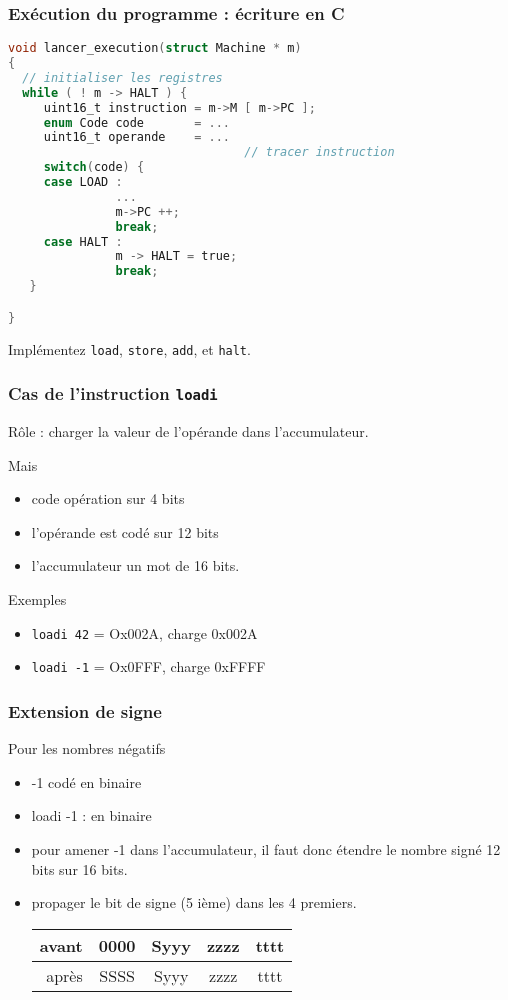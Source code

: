 \documentclass[]{beamer}
\begin{document}
\begin{frame}[containsverbatim]
  \frametitle{Exécution du programme : écriture en C}
\footnotesize
\begin{lstlisting}[frame=single, language=C]
void lancer_execution(struct Machine * m) 
{
  // initialiser les registres
  while ( ! m -> HALT ) { 
     uint16_t instruction = m->M [ m->PC ];
     enum Code code       = ... 
     uint16_t operande    = ...
                                 // tracer instruction
     switch(code) {
     case LOAD :
               ...
               m->PC ++;
               break;
     case HALT :
               m -> HALT = true;
               break;
   }

}
\end{lstlisting}
\alert{Implémentez} \texttt{load}, \texttt{store}, \texttt{add}, et \texttt{halt}.

\end{frame}

\begin{frame}[containsverbatim]
\frametitle{Cas de l'instruction \texttt{loadi}}

\alert{Rôle} : charger la valeur de l'opérande
dans l'accumulateur.

Mais
\begin{itemize}
\item code opération sur 4 bits
\item l'opérande est codé sur 12 bits
\item l'accumulateur un mot de 16 bits.
\end{itemize}

\begin{block}{Exemples }
\begin{itemize}
\item 
 \texttt{loadi 42} = Ox0\alert{02A}, charge 0x\alert{002A}
\item 
 \texttt{loadi -1} = Ox0\alert{FFF}, charge 0x\alert{FFFF}
\end{itemize}
\end{block}
\end{frame}

\begin{frame}
\frametitle{Extension de signe}
Pour les nombres négatifs
\begin{itemize}
\item -1 codé  en binaire
\item loadi -1 :  en binaire
\item pour amener -1 dans l'accumulateur, il faut donc
étendre le nombre signé 12 bits sur 16 bits.
\item propager le bit de signe (5 ième) dans les 4 premiers.
\begin{tabular}{r|cccc|}
\hline
avant & 0000 & Syyy & zzzz & tttt \\
\hline
après & SSSS & Syyy & zzzz & tttt \\
\hline

\end{tabular}
\end{itemize}
\end{frame}
\end{document}
